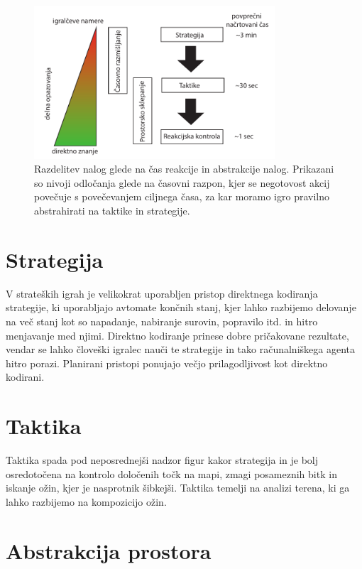 \documentclass[a4paper, 12pt]{book}
\begin{document}
\begin{itemize}
	\begin{figure}[h]
		\begin{center}
			\includegraphics[width=0.8\textwidth]{photos/RazdelitevNalog.pdf}
		\end{center}
		\caption{Razdelitev nalog glede na čas reakcije in abstrakcije nalog. 
			Prikazani so nivoji odločanja glede na časovni razpon, kjer se negotovost akcij povečuje s povečevanjem ciljnega časa, za kar moramo igro pravilno abstrahirati na taktike in strategije. }
		\label{picRazdelitevNalog}
	\end{figure}

\end{itemize}

\section{Strategija}
V strateških igrah je velikokrat uporabljen pristop direktnega kodiranja strategije, ki uporabljajo avtomate končnih stanj, kjer lahko razbijemo delovanje na več stanj kot so napadanje, nabiranje surovin, popravilo itd. in hitro menjavanje med njimi. 
Direktno kodiranje prinese dobre pričakovane rezultate, vendar se lahko človeški igralec nauči te strategije in tako računalniškega agenta hitro porazi.
Planirani pristopi ponujajo večjo prilagodljivost kot direktno kodirani.
\section{Taktika}
Taktika spada pod neposrednejši nadzor figur kakor strategija in je bolj osredotočena na kontrolo določenih točk na mapi, zmagi posameznih bitk in iskanje ožin, kjer je nasprotnik šibkejši. 
Taktika temelji na analizi terena, ki ga lahko razbijemo na kompozicijo ožin.

\section{Abstrakcija prostora}
\end{document}
